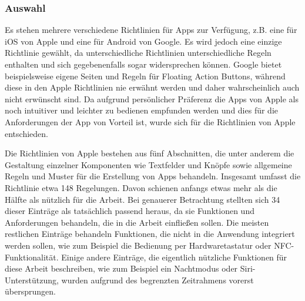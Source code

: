 \subsubsection{Auswahl}


\myNewSection
	Es stehen mehrere verschiedene Richtlinien für Apps zur Verfügung, z.B. eine für iOS von Apple und eine für Android von Google\cite{konventionen_guidelinesApple, konventionen_guidelinesGoogle}. %
	Es wird jedoch eine einzige Richtlinie gewählt, da unterschiedliche Richtlinien unterschiedliche Regeln enthalten und sich gegebenenfalls sogar widersprechen können. %
		Google bietet beispielsweise eigene Seiten und Regeln für \glqq Floating Action Buttons\grqq{}\cite{konventionen_floatingActionButton}, während diese in den Apple Richtlinien nie erwähnt werden und daher wahrscheinlich auch nicht erwünscht sind. %
	Da aufgrund persönlicher Präferenz die Apps von Apple als noch intuitiver und leichter zu bedienen empfunden werden und dies für die Anforderungen der App von Vorteil ist, wurde sich für die Richtlinien von Apple entschieden.%
	
\myNewSection
	Die Richtlinien von Apple bestehen aus fünf Abschnitten, die unter anderem die Gestaltung einzelner Komponenten wie Textfelder und Knöpfe sowie allgemeine Regeln und Muster für die Erstellung von Apps behandeln. Insgesamt umfasst die Richtlinie etwa 148 Regelungen. %
	Davon schienen anfangs etwas mehr als die Hälfte als nützlich für die Arbeit. Bei genauerer Betrachtung stellten sich 34 dieser Einträge als tatsächlich passend heraus, da sie Funktionen und Anforderungen behandeln, die in die Arbeit einfließen sollen. %
	Die meisten restlichen Einträge behandeln Funktionen, die nicht in die Anwendung integriert werden sollen, wie zum Beispiel die Bedienung per Hardwaretastatur oder NFC-Funktionalität\cite{konventionen_keyboard, konventionen_nfc}. Einige andere Einträge, die eigentlich nützliche Funktionen für diese Arbeit beschreiben, wie zum Beispiel ein Nachtmodus oder Siri-Unterstützung, wurden aufgrund des begrenzten Zeitrahmens vorerst übersprungen\cite{konventionen_darkmode,konventionen_siri}.%